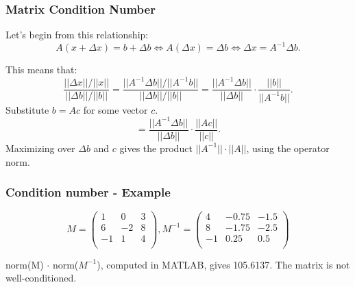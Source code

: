 \documentclass[12pt]{beamer}
\theoremstyle{definition}
\begin{document}
\begin{frame}
\frametitle{Matrix Condition Number}
Let's begin from this relationship:
\[A(x+ \Delta x) = b + \Delta b  \iff A (\Delta x) = \Delta b \iff  \Delta x = A^{-1} \Delta b.\]

This means that:
\[
\dfrac{|| \Delta x ||/|| x|| }{|| \Delta b||/ ||b||} = 
\dfrac{|| A^{-1} \Delta b||/|| A^{-1} b|| }
{|| \Delta b||/ ||b||} = \dfrac{|| A^{-1} \Delta b||}{|| \Delta b||} \cdot
\dfrac{ ||b||}{|| A^{-1} b|| }.
\]
Substitute $b = Ac$ for some vector $c$.
\[
= \dfrac{|| A^{-1} \Delta b||}{|| \Delta b||} \cdot
\dfrac{ ||Ac||}{|| c|| }.\]
Maximizing over $\Delta b$ and $c$ gives the product
$||A^{-1}|| \cdot ||A||$, using the operator norm.

\end{frame}

\begin{frame}
\frametitle{Condition number - Example}


\[M = 
\left(\begin{array}{ccc}
1 & 0 & 3 \\
6 & -2 & 8 \\
-1 & 1 & 4 \\
\end{array}\right),
M^{-1} = 
\left(\begin{array}{ccc}
4 & -0.75 & -1.5 \\
8 & -1.75 & -2.5 \\
-1 & 0.25 & 0.5 \\
\end{array}\right)\]

 norm(M) $\cdot$ norm($M^{-1}$), computed in MATLAB,
gives 105.6137. The matrix is not well-conditioned.
\end{frame}
\end{document}
